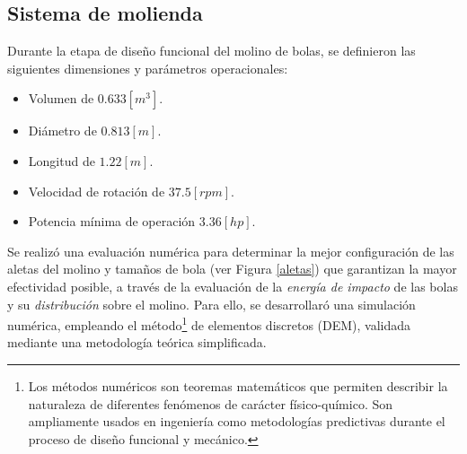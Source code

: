 \begin{center}
	\section{Sistema de molienda}
\end{center}

\noindent
\justify

Durante la etapa de dise\~no funcional del molino de bolas, se definieron las siguientes dimensiones y par\'ametros operacionales:

\begin{itemize}
	\item Volumen de $0.633 \left[m ^3 \right]$.
	\item Di\'ametro de $0.813 [m]$.
	\item Longitud de $1.22 [m]$.
	\item Velocidad de rotaci\'on de $37.5 [rpm]$.
	\item Potencia m\'inima de operaci\'on $3.36 [hp]$.
\end{itemize}

\vspace{-1mm}

\noindent
\justify

Se realiz\'o una evaluaci\'on num\'erica para determinar la mejor configuraci\'on de las aletas del molino y tama\~nos de bola (ver Figura \ref{aletas}) que garantizan la mayor efectividad posible, a trav\'es de la evaluaci\'on de la \textit{energ\'ia de impacto} de las bolas y su \textit{distribuci\'on} sobre el molino. Para ello, se desarrollar\'o una simulaci\'on num\'erica, empleando el m\'etodo\footnote{Los m\'etodos num\'ericos son teoremas matem\'aticos que permiten describir la naturaleza de diferentes fen\'omenos de car\'acter f\'isico-qu\'imico. Son ampliamente usados en ingenier\'ia como metodolog\'ias predictivas durante el proceso de dise\~no funcional y mec\'anico.} de elementos discretos (DEM), validada mediante una metodolog\'ia te\'orica simplificada.









